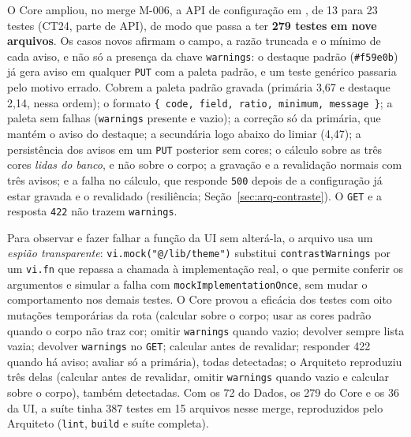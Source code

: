 O Core ampliou, no merge M-006, a API de configuração em , de 13 para 23 testes (CT24, parte de API), de modo que  passa a ter \textbf{279 testes em nove arquivos}. Os casos novos afirmam o campo, a razão truncada e o mínimo de cada aviso, e não só a presença da chave \texttt{warnings}: o destaque padrão (\texttt{\#f59e0b}) já gera aviso em qualquer \texttt{PUT} com a paleta padrão, e um teste genérico passaria pelo motivo errado. Cobrem a paleta padrão gravada (primária 3,67 e destaque 2,14, nessa ordem); o formato \texttt{\{ code, field, ratio, minimum, message \}}; a paleta sem falhas (\texttt{warnings} presente e vazio); a correção só da primária, que mantém o aviso do destaque; a secundária logo abaixo do limiar (4,47); a persistência dos avisos em um \texttt{PUT} posterior sem cores; o cálculo sobre as três cores \emph{lidas do banco}, e não sobre o corpo; a gravação e a revalidação normais com três avisos; e a falha no cálculo, que responde \texttt{500} depois de a configuração já estar gravada e o  revalidado (resiliência; Seção~\ref{sec:arq-contraste}). O \texttt{GET} e a resposta \texttt{422} não trazem \texttt{warnings}.

Para observar e fazer falhar a função da UI sem alterá-la, o arquivo usa um \emph{espião transparente}: \texttt{vi.mock("@/lib/theme")} substitui \texttt{contrastWarnings} por um \texttt{vi.fn} que repassa a chamada à implementação real, o que permite conferir os argumentos e simular a falha com \texttt{mockImplementationOnce}, sem mudar o comportamento nos demais testes. O Core provou a eficácia dos testes com oito mutações temporárias da rota (calcular sobre o corpo; usar as cores padrão quando o corpo não traz cor; omitir \texttt{warnings} quando vazio; devolver sempre lista vazia; devolver \texttt{warnings} no \texttt{GET}; calcular antes de revalidar; responder 422 quando há aviso; avaliar só a primária), todas detectadas; o Arquiteto reproduziu três delas (calcular antes de revalidar, omitir \texttt{warnings} quando vazio e calcular sobre o corpo), também detectadas. Com os 72 do Dados, os 279 do Core e os 36 da UI, a suíte tinha 387 testes em 15 arquivos nesse merge, reproduzidos pelo Arquiteto (\texttt{lint}, \texttt{build} e suíte completa).

